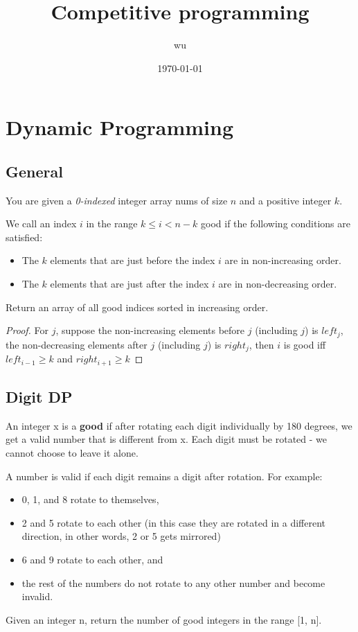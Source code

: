 \documentclass[11pt]{article}
\author{wu}
\date{\today}
\title{Competitive programming}
\begin{document}
\maketitle
\tableofcontents


\section{Dynamic Programming}
\label{sec:org75b41e6}
\subsection{General}
\label{sec:org291f299}
\begin{problem}
You are given a \emph{0-indexed} integer array nums of size \(n\) and a positive integer \(k\).

We call an index \(i\) in the range \(k\le i< n-k\) good if the following conditions are satisfied:
\begin{itemize}
\item The \(k\) elements that are just before the index \(i\) are in non-increasing order.
\item The \(k\) elements that are just after the index \(i\) are in non-decreasing order.
\end{itemize}

Return an array of all good indices sorted in increasing order.
\end{problem}

\begin{proof}
For \(j\), suppose the non-increasing elements before \(j\) (including \(j\)) is \(left_j\), the
non-decreasing elements after \(j\) (including \(j\)) is \(right_j\), then \(i\) is good iff
\(left_{i-1}\ge k\) and \(right_{i+1}\ge k\)
\end{proof}

\subsection{Digit DP}
\label{sec:org8153b9a}
\begin{problem}
An integer x is a \textbf{good} if after rotating each digit individually by 180 degrees, we get a valid
number that is different  from x. Each digit must be rotated - we cannot choose to leave it alone.

A number is valid if each digit remains a digit after rotation. For example:
\begin{itemize}
\item 0, 1, and 8 rotate to themselves,
\item 2 and 5 rotate to each other (in this case they are rotated in a different direction, in other
words, 2 or 5 gets mirrored)
\item 6 and 9 rotate to each other, and
\item the rest of the numbers do not rotate to any other number and become invalid.
\end{itemize}

Given an integer n, return the number of good integers in the range [1, n].
\end{problem}
\end{document}
